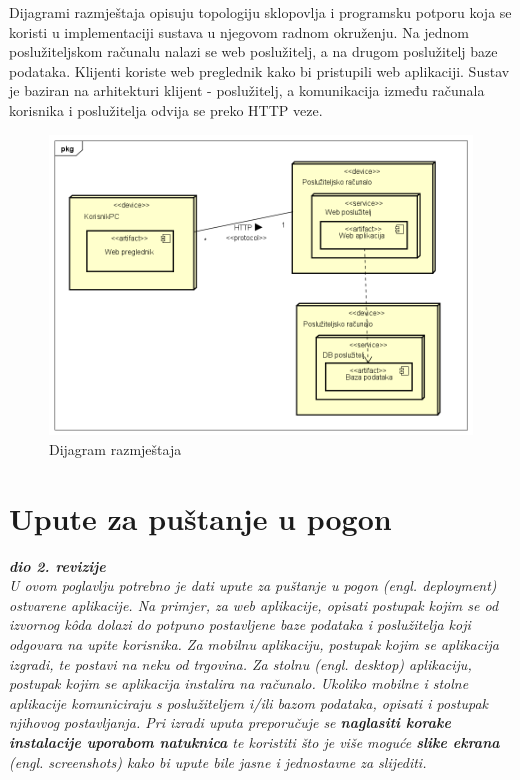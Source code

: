             Dijagrami razmještaja opisuju topologiju sklopovlja i programsku potporu koja se koristi u implementaciji sustava  u njegovom radnom okruženju. Na jednom poslužiteljskom računalu nalazi se web poslužitelj, a na drugom poslužitelj baze podataka. Klijenti koriste web preglednik kako bi pristupili web aplikaciji. Sustav je baziran na arhitekturi klijent - poslužitelj, a komunikacija između računala korisnika i poslužitelja odvija se preko HTTP veze. 
            
			\begin{figure}[H]
			\includegraphics[scale=0.7]{slike/DijagramRazmjestaja.png}
			\centering
			\caption{Dijagram razmještaja}
			\label{fig:promjene}
				\end{figure}
			
			\eject 
		
		\section{Upute za puštanje u pogon}
		
			\textbf{\textit{dio 2. revizije}}\\
		
			 \textit{U ovom poglavlju potrebno je dati upute za puštanje u pogon (engl. deployment) ostvarene aplikacije. Na primjer, za web aplikacije, opisati postupak kojim se od izvornog kôda dolazi do potpuno postavljene baze podataka i poslužitelja koji odgovara na upite korisnika. Za mobilnu aplikaciju, postupak kojim se aplikacija izgradi, te postavi na neku od trgovina. Za stolnu (engl. desktop) aplikaciju, postupak kojim se aplikacija instalira na računalo. Ukoliko mobilne i stolne aplikacije komuniciraju s poslužiteljem i/ili bazom podataka, opisati i postupak njihovog postavljanja. Pri izradi uputa preporučuje se \textbf{naglasiti korake instalacije uporabom natuknica} te koristiti što je više moguće \textbf{slike ekrana} (engl. screenshots) kako bi upute bile jasne i jednostavne za slijediti.}
			
